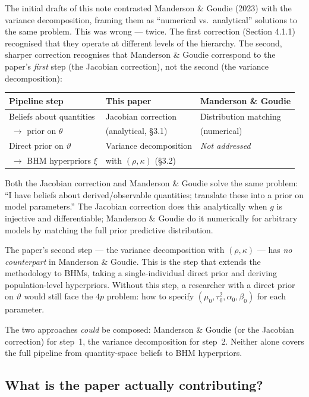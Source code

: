 \documentclass[12pt,a4paper]{article}
\begin{document}
The initial drafts of this note contrasted Manderson \& Goudie (2023) with the
variance decomposition, framing them as ``numerical vs.\ analytical'' solutions
to the same problem. This was wrong --- twice. The first correction (Section
4.1.1) recognised that they operate at different levels of the hierarchy. The
second, sharper correction recognises that Manderson \& Goudie correspond to
the paper's \emph{first} step (the Jacobian correction), not the second
(the variance decomposition):

\begin{center}
\begin{tabular}{lll}
\toprule
\textbf{Pipeline step} & \textbf{This paper} & \textbf{Manderson \& Goudie} \\
\midrule
Beliefs about quantities & Jacobian correction & Distribution matching \\
$\;\to$ prior on $\theta$ & (analytical, \S3.1) & (numerical) \\
\addlinespace
Direct prior on $\vartheta$ & Variance decomposition & \emph{Not addressed} \\
$\;\to$ BHM hyperpriors $\xi$ & with $(\rho, \kappa)$ (\S3.2) & \\
\bottomrule
\end{tabular}
\end{center}

\noindent Both the Jacobian correction and Manderson \& Goudie solve the same
problem: ``I have beliefs about derived/observable quantities; translate these
into a prior on model parameters.'' The Jacobian correction does this
analytically when $g$ is injective and differentiable; Manderson \& Goudie do
it numerically for arbitrary models by matching the full prior predictive
distribution.

The paper's second step --- the variance decomposition with $(\rho, \kappa)$
--- has \emph{no counterpart} in Manderson \& Goudie. This is the step that
extends the methodology to BHMs, taking a single-individual direct prior and
deriving population-level hyperpriors. Without this step, a researcher with a
direct prior on $\vartheta$ would still face the $4p$ problem: how to specify
$(\mu_0, \tau_0^2, \alpha_0, \beta_0)$ for each parameter.

The two approaches \emph{could} be composed: Manderson \& Goudie (or the
Jacobian correction) for step~1, the variance decomposition for step~2. Neither
alone covers the full pipeline from quantity-space beliefs to BHM hyperpriors.

\subsection{What is the paper actually contributing?}
\end{document}
